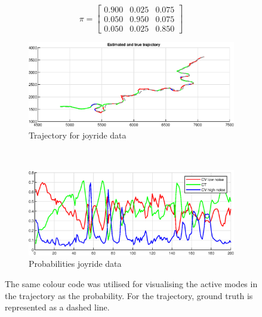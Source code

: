 \begin{equation}
    \label{eq:ga_1_joyride_pi_matrix}
    \pi = \begin{bmatrix}
        0.900 & 0.025 & 0.075 \\
        0.050 & 0.950 & 0.075 \\
        0.050 & 0.025 & 0.850 
    \end{bmatrix}
\end{equation}

\begin{figure}[ht]
    \centering
    \begin{subfigure}[h]{0.4\textwidth}
        \includegraphics[width=\textwidth]{figures/ga_1/joyride_estimated_trajectory}
        \caption{Trajectory for joyride data}
        \label{fig:ga_1_joyride_estimated_trajectory}
    \end{subfigure}%
    ~
    \begin{subfigure}[h]{0.4\textwidth}
        \includegraphics[width=\textwidth]{figures/ga_1/joyride_probs}
        \caption{Probabilities joyride data}
        \label{fig:ga_1_joyride_probabilities}
    \end{subfigure}
    \caption{The same colour code was utilised for visualising the active modes in the trajectory as the probability. For the trajectory, ground truth is represented as a dashed line. }
    \label{fig:ga_1_joyride_traj_and_probs} 
\end{figure}


